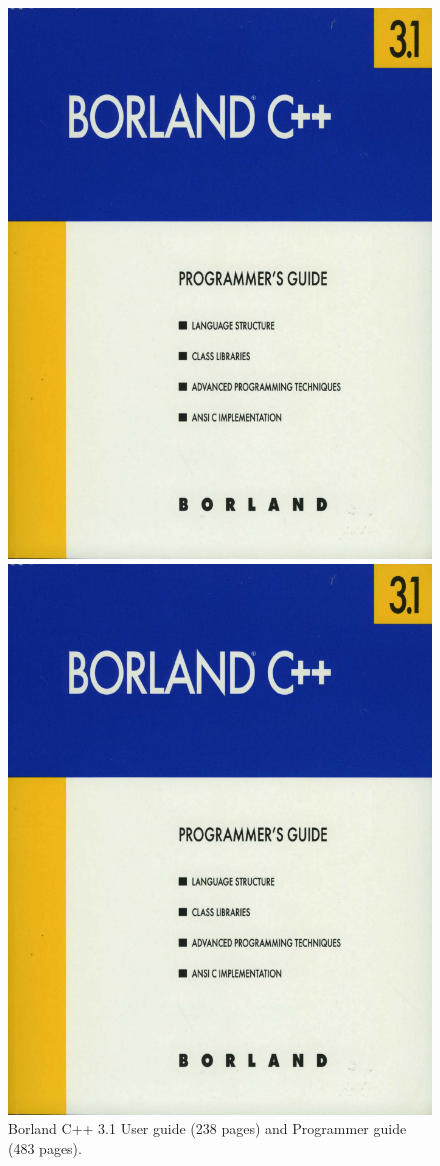 \documentclass[book.tex]{subfiles}
\begin{document}
\par
\begin{figure}[H]
\centering
\begin{minipage}{.5\textwidth}
  \centering
  \includegraphics[width=.5\linewidth]{screenshots_300dpi/borland_programmer_guide.png}
\end{minipage}%
\begin{minipage}{.5\textwidth}
  \centering
  \includegraphics[width=.5\linewidth]{screenshots_300dpi/borland_programmer_guide.png}
\end{minipage}
\caption{Borland C++ 3.1 User guide (238 pages) and Programmer guide (483 pages).}
\end{figure}


\par
\begin{figure}[H]
\centering
\end{figure}
\end{document}
